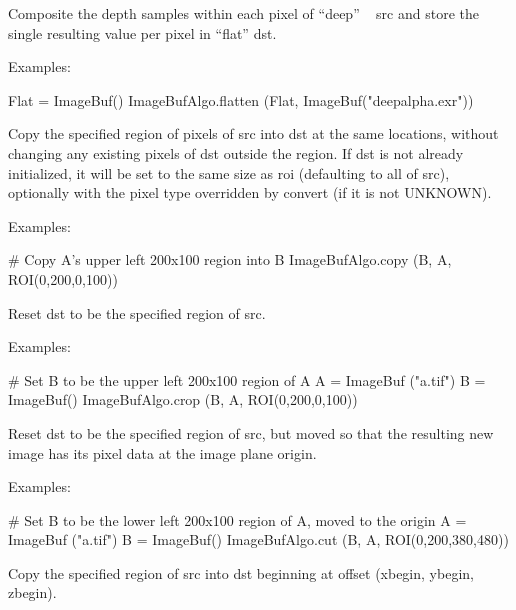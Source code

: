 Composite the depth samples within each pixel of ``deep'' \ImageBuf\ {\cf
src} and store the single  resulting value per pixel in ``flat'' \ImageBuf
{\cf dst}.

\smallskip
\noindent Examples:
\begin{code}
    Flat = ImageBuf()
    ImageBufAlgo.flatten (Flat, ImageBuf("deepalpha.exr"))
\end{code}
\apiend


 
Copy the specified region of pixels of {\cf src} into {\cf dst} at the same
locations, without changing any existing pixels of {\cf dst} outside the
region.  If {\cf dst} is not already initialized, it will be set to the same
size as {\cf roi} (defaulting to all of {\cf src}), optionally with the pixel
type overridden by {\cf convert} (if it is not {\cf UNKNOWN}).

\smallskip
\noindent Examples:
\begin{code}
    # Copy A's upper left 200x100 region into B
    ImageBufAlgo.copy (B, A, ROI(0,200,0,100))
\end{code}
\apiend


 
Reset {\cf dst} to be the specified region of {\cf src}.

\smallskip
\noindent Examples:
\begin{code}
    # Set B to be the upper left 200x100 region of A
    A = ImageBuf ("a.tif")
    B = ImageBuf()
    ImageBufAlgo.crop (B, A, ROI(0,200,0,100))
\end{code}
\apiend


 
Reset {\cf dst} to be the specified region of {\cf src}, but moved so
that the resulting new image has its pixel data at the image plane origin.

\smallskip
\noindent Examples:
\begin{code}
    # Set B to be the lower left 200x100 region of A, moved to the origin
    A = ImageBuf ("a.tif")
    B = ImageBuf()
    ImageBufAlgo.cut (B, A, ROI(0,200,380,480))
\end{code}
\apiend


 
Copy the specified region of {\cf src} into {\cf dst} beginning at 
offset {\cf (xbegin, ybegin, zbegin)}.


